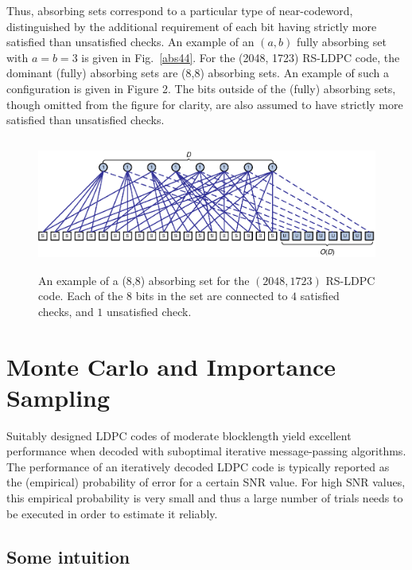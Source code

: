 Thus, absorbing sets correspond to a particular type of near-codeword,
distinguished by the additional requirement of each bit having
strictly more satisfied than unsatisfied checks.  An example of an
$(a,b)$ fully absorbing set with $a=b=3$ is given in Fig.~\ref{abs44}.
For the (2048, 1723) RS-LDPC code, the dominant (fully) absorbing sets
are (8,8) absorbing sets. An example of such a configuration is given
in Figure 2. The bits outside of the (fully) absorbing sets, though
omitted from the figure for clarity, are also assumed to have strictly
more satisfied than unsatisfied checks.


\begin{figure}
\vspace{0.0in}\hspace{0.4in}\includegraphics[width=5.4in,height=1.7in]{ITW07_88.eps}
\caption{An example of a (8,8) absorbing set for the $(2048,1723)$
RS-LDPC code.  Each of the $8$ bits in the set are connected to $4$
satisfied checks, and $1$ unsatisfied check.  } \label{abs88}
\end{figure}







\vspace{0in}\section{Monte Carlo and Importance Sampling}
\label{isback}

Suitably designed LDPC codes of moderate blocklength yield excellent
performance when decoded with suboptimal iterative message-passing
algorithms.  The performance of an iteratively decoded LDPC code is
typically reported as the (empirical) probability of error for a
certain SNR value. For high SNR values, this empirical probability is
very small and thus a large number of trials needs to be executed in
order to estimate it reliably.

\subsection{Some intuition}

